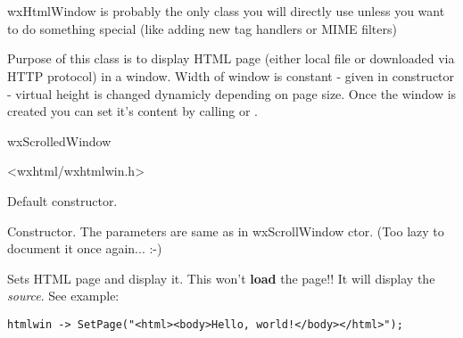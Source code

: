 %
%


\section{}\label{wxhtmlwindow}

wxHtmlWindow is probably the only class you will directly use
unless you want to do something special (like adding new tag
handlers or MIME filters)

Purpose of this class is to display HTML page (either local
file or downloaded via HTTP protocol) in a window. Width
of window is constant - given in constructor - virtual height
is changed dynamicly depending on page size.
Once the window is created you can set it's content by calling
 or 
. 



wxScrolledWindow


<wxhtml/wxhtmlwin.h>

\label{wxhtmlwindowwxhtmlwindow}


Default constructor.


Constructor. The parameters are same as in wxScrollWindow ctor.
(Too lazy to document it once again... :-)





\label{wxhtmlwindowsetpage}


Sets HTML page and display it. This won't {\bf load} the page!!
It will display the {\it source}. See example:

\begin{verbatim}
htmlwin -> SetPage("<html><body>Hello, world!</body></html>");
\end{verbatim}

